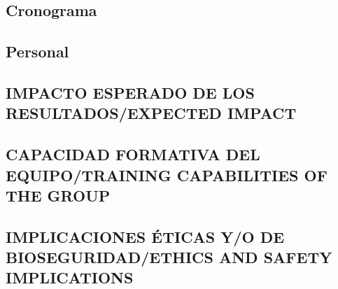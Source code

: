 \documentclass[a4paper,11pt,oneside]{article}
\begin{document}
\subsection*{\sc Cronograma}

%

\subsection*{\sc Personal}

\subsection{\sc IMPACTO ESPERADO DE LOS RESULTADOS/EXPECTED IMPACT}
\subsection{\sc CAPACIDAD FORMATIVA DEL EQUIPO/TRAINING CAPABILITIES OF THE GROUP}
\subsection{\sc IMPLICACIONES ÉTICAS Y/O DE BIOSEGURIDAD/ETHICS AND SAFETY IMPLICATIONS}
\end{document}
